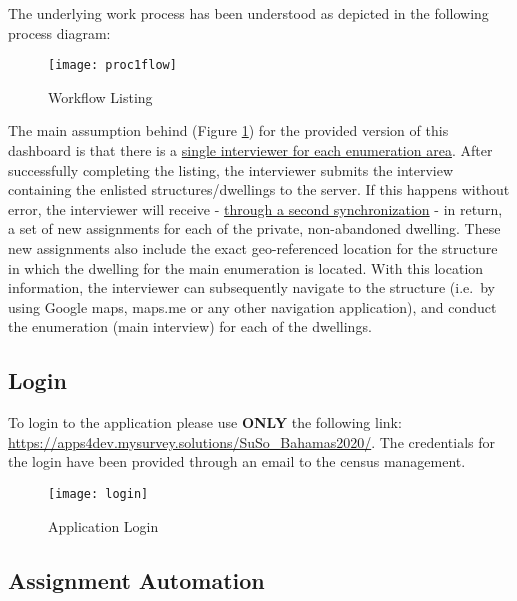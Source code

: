 \documentclass[a4paper]{article}
\begin{document}
The underlying work process has been understood as depicted in the following process diagram:

\begin{figure}

{\centering \texttt{[image: proc1flow]} 

}

\caption{Workflow Listing}\label{fig:proc1}
\end{figure}

The main assumption behind (Figure \ref{fig:proc1}) for the provided version of this dashboard is that there is a \underline{single interviewer for each enumeration area}. After successfully completing the listing, the interviewer submits the interview containing the enlisted structures/dwellings to the server. If this happens without error, the interviewer will receive - \underline{through a second synchronization} - in return, a set of new assignments for each of the private, non-abandoned dwelling. These new assignments also include the exact geo-referenced location for the structure in which the dwelling for the main enumeration is located. With this location information, the interviewer can subsequently navigate to the structure (i.e.~by using Google maps, maps.me or any other navigation application), and conduct the enumeration (main interview) for each of the dwellings.

\newpage

\hypertarget{login}{%
\subsection{Login}\label{login}}

To login to the application please use \textbf{ONLY} the following link: \url{https://apps4dev.mysurvey.solutions/SuSo_Bahamas2020/}. The credentials for the login have been provided through an email to the census management.

\begin{figure}

{\centering \texttt{[image: login]} 

}

\caption{Application Login}\label{fig:login}
\end{figure}

\newpage

\hypertarget{assignment-automation}{%
\subsection{Assignment Automation}\label{assignment-automation}}
\end{document}
